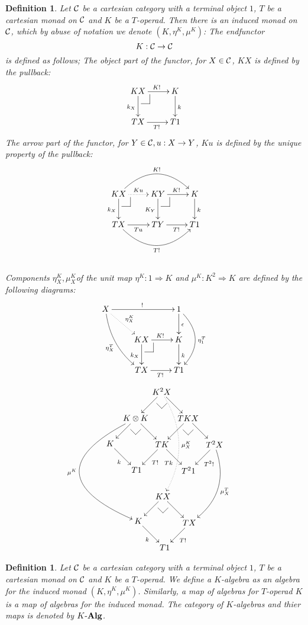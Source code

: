 \documentclass[12pt]{article}
\makeatletter
\theoremstyle{plain}
\newtheorem{definition}[theorem]{Definition}
\theoremstyle{definition}
\newcommand{\pullbackmark}[2]{\save ;p+<.8pc,0pc>:(0,-1)::%
(#1) *{\phantom{Z}} %
;p+(#2)-(0,0) **@{-}%
;p-(#1)+(0,0) *{\phantom{Z}} **@{-} \restore}
\makeatother
\begin{document}
\begin{definition}
Let ${\cal C}$ be a cartesian category with a terminal object $1$, $T$ be a cartesian monad on ${\cal C}$ and $K$ be a $T$-operad. Then there is an {\em induced monad} on ${\cal C}$, which by abuse of notation we denote $(K, \eta^K, \mu^K)$: The endfunctor
\[
K: {\cal C} \rightarrow {\cal C}
\]
is defined as follows; The object part of the functor, for $X \in {\cal C}$, $KX$ is defined by the pullback:
\[ \xymatrix{
KX \ar[r]^{K!} \ar[d]_{k_X} \pullbackmark{0,1.5}{1.5,0} & K \ar[d]^k \\
TX \ar[r]_{T!} & T1
} \]
The arrow part of the functor, for $Y \in {\cal C}, u: X \rightarrow Y$, $Ku$ is defined by the unique property of the pullback: \vspace{5pt}
\[ \xymatrix{
KX \ar@{.>}[r]^{Ku} \ar[d]_{k_X} \pullbackmark{0,1.5}{1.5,0} \ar@/^25pt/[rr]^{K!} & KY \ar[r]^{K!} \ar[d]_{K_Y} \pullbackmark{0,1.5}{1.5,0} & K \ar[d]^{k} \\
TX \ar[r]_{Tu} \ar@/_25pt/[rr]_{T!} & TY \ar[r]_{T!} & T1
} \] \vspace{10pt} \\
Components  $\eta^K_X, \mu^K_X$of the unit map $\eta^K: 1 \Rightarrow K$ and $\mu^K:K^2 \Rightarrow K$ are defined by the following diagrams: 
\[ \xymatrix{
X \ar@{.>}[rd]^{\eta^K_X} \ar[rr]^{!} \ar@/_10pt/[rdd]_{\eta^T_X} & & 1 \ar[d]^{\epsilon} \ar@/^20pt/[dd]^{\eta^T_1} \\
& KX \ar[r]^{K!} \ar[d]_{k_X} \pullbackmark{0,1.5}{1.5,0} & K \ar[d]^k \\
& TX \ar[r]_{T!} & T1
} \]
\[ \xymatrix@dr{
K^2 X \ar[r] \ar[d] \pullbackmark{1,1}{-1,1} \ar@{.>}@/^20pt/[rrdd]^{\mu^K_X} & TKX \ar[r] \ar[d] \pullbackmark{1,1}{-1,1} & T^2 X \ar[d]^{T^2 !} \ar@/^20pt/[rdd]^{\mu^T_X} & \\
K \otimes K \ar[r] \ar[d] \pullbackmark{1,1}{-1,1} \ar@/_70pt/[rrdd]_{\mu^K} & TK \ar[r]_{Tk} \ar[d]^{T!} & T^2 1 & \\
K \ar[r]_k & T1 & KX \ar[r] \ar[d] \pullbackmark{1,1}{-1,1} & TX \ar[d]^{T!} \\
& & K \ar[r]_{k} & T1 
} \]
\end{definition}

\begin{definition}
Let ${\cal C}$ be a cartesian category with a terminal object $1$, $T$ be a cartesian monad on ${\cal C}$ and $K$ be a $T$-operad. We define a \emph{$K$-algebra} as an algebra for the induced monad $(K, \eta^K , \mu^K )$. Similarly, a \emph{map} of algebras for $T$-operad $K$ is a map of algebras for the induced monad. The category of $K$-algebras and thier maps is denoted by $K \mathchar`- {\bf Alg}$.
\end{definition}
\end{document}
